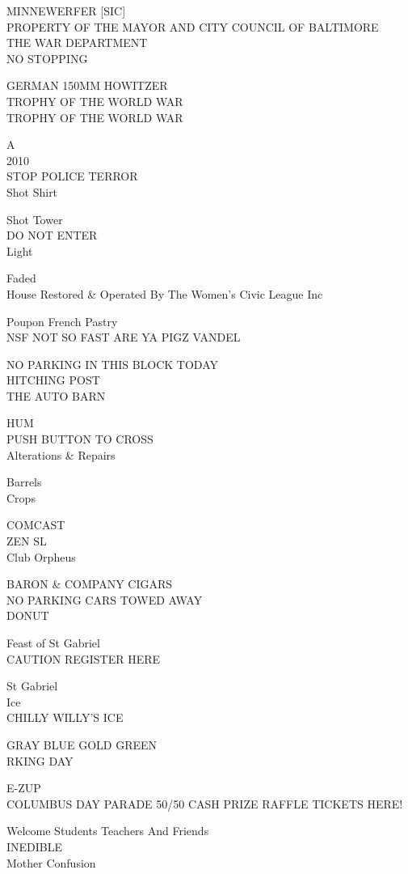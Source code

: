 \documentclass[10pt,letterpaper]{article}
\begin{document}
MINNEWERFER {[}SIC{]}\\
PROPERTY OF THE MAYOR AND CITY COUNCIL OF BALTIMORE\\
THE WAR DEPARTMENT\\
NO STOPPING

GERMAN 150MM HOWITZER\\
TROPHY OF THE WORLD WAR\\
TROPHY OF THE WORLD WAR

A\\
2010\\
STOP POLICE TERROR\\
Shot Shirt

Shot Tower\\
DO NOT ENTER\\
Light

Faded\\
House Restored \& Operated By The Women's Civic League Inc

Poupon French Pastry\\
NSF NOT SO FAST ARE YA PIGZ VANDEL

NO PARKING IN THIS BLOCK TODAY\\
HITCHING POST\\
THE AUTO BARN

HUM\\
PUSH BUTTON TO CROSS\\
Alterations \& Repairs

Barrels\\
Crops

COMCAST\\
ZEN SL\\
Club Orpheus

BARON \& COMPANY CIGARS\\
NO PARKING CARS TOWED AWAY\\
DONUT

Feast of St Gabriel\\
CAUTION REGISTER HERE

St Gabriel\\
Ice\\
CHILLY WILLY'S ICE

GRAY BLUE GOLD GREEN\\
RKING DAY

E{-}ZUP\\
COLUMBUS DAY PARADE 50/50 CASH PRIZE RAFFLE TICKETS HERE!

Welcome Students Teachers And Friends\\
INEDIBLE\\
Mother Confusion
\end{document}
